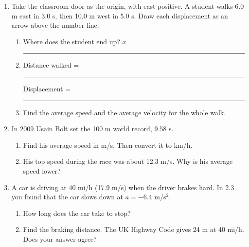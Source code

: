 \documentclass[12pt, twoside]{article}
\begin{document}
\begin{enumerate}[itemsep=0.4cm]

\item Take the classroom door as the origin, with east positive. A student walks
  6.0 m east in 3.0 s, then 10.0 m west in 5.0 s. Draw each displacement as an arrow
  above the number line.

  \begin{center}
  \end{center}

  \begin{enumerate}[itemsep=0.5cm]
    \item Where does the student end up? \hfill $x = $ \rule{2.5cm}{0.4pt}
    \item Distance walked = \rule{2.5cm}{0.4pt} \hfill
      Displacement = \rule{2.5cm}{0.4pt}
    \item Find the average speed and the average velocity for the whole walk.
      \vspace{2.2cm}
  \end{enumerate}

\item In 2009 Usain Bolt set the 100 m world record, 9.58 s.
  \begin{enumerate}[itemsep=0.5cm]
    \item Find his average speed in m/s. Then convert it to km/h.
      \vspace{3.0cm}
    \item His top speed during the race was about 12.3 m/s. Why is his average
      speed lower?
      \vspace{1.2cm}
  \end{enumerate}

\newpage

\item A car is driving at 40 mi/h (17.9 m/s) when the driver brakes hard. In 2.3 you
  found that the car slows down at $a = -6.4$ m/s$^2$.
  \begin{enumerate}[itemsep=0.3cm]
    \item How long does the car take to stop?
      \vspace{1.8cm}
    \item Find the braking distance. The UK Highway Code gives 24 m at 40 mi/h. Does
      your answer agree?
      \vspace{1.9cm}
  \end{enumerate}


\end{enumerate}
\end{document}
